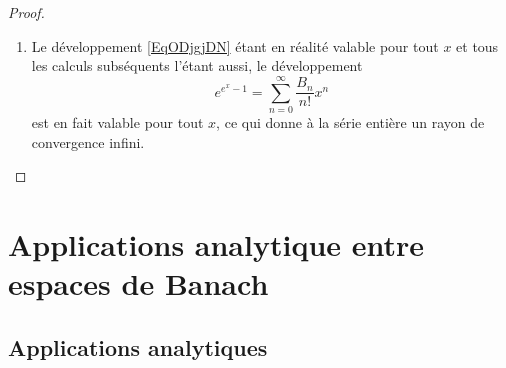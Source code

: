 \begin{proof}
\begin{enumerate}
\begin{equation}
		      \end{equation}
		      Cela est un développement en série entière pour la fonction \( \frac{1}{ e } e^{e^x}\), dont nous savions déjà le développement \eqref{EqYCMGBmP}; par unicité du développement\footnote{Proposition \ref{PROPooVUEYooYemzhe}.} nous pouvons identifier les coefficients :
		      \begin{equation}
			      B_l=\frac{1}{ e }\sum_{k=0}^{\infty}\frac{ k^l }{ k! }.
		      \end{equation}
		\item
		      Le développement \eqref{EqODjgjDN} étant en réalité valable pour tout \( x\) et tous les calculs subséquents l'étant aussi, le développement
		      \begin{equation}
			      e^{e^x-1}=\sum_{n=0}^{\infty}\frac{ B_n }{ n! }x^n
		      \end{equation}
		      est en fait valable pour tout \( x\), ce qui donne à la série entière un rayon de convergence infini.
	\end{enumerate}
\end{proof}


\section{Applications analytique entre espaces de Banach}


\subsection{Applications analytiques}

